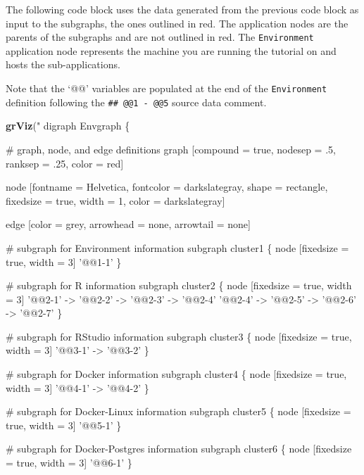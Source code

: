 \documentclass[]{book}
\newenvironment{Shaded}{\begin{snugshade}}{\end{snugshade}}
\newcommand{\KeywordTok}[1]{\textcolor[rgb]{0.13,0.29,0.53}{\textbf{#1}}}
\newcommand{\NormalTok}[1]{#1}
\newcommand{\StringTok}[1]{\textcolor[rgb]{0.31,0.60,0.02}{#1}}
\theoremstyle{definition}
\theoremstyle{definition}
\theoremstyle{definition}
\theoremstyle{remark}
\begin{document}
The following code block uses the data generated from the previous code
block as input to the subgraphs, the ones outlined in red. The
application nodes are the parents of the subgraphs and are not outlined
in red. The \texttt{Environment} application node represents the machine
you are running the tutorial on and hosts the sub-applications.

Note that the `@@' variables are populated at the end of the
\texttt{Environment} definition following the \texttt{\#\#\ @@1\ -\ @@5}
source data comment.

\begin{Shaded}
\begin{Highlighting}[]
\KeywordTok{grViz}\NormalTok{(}\StringTok{"}
\StringTok{digraph Envgraph \{}

\StringTok{  # graph, node, and edge definitions}
\StringTok{  graph [compound = true, nodesep = .5, ranksep = .25,}
\StringTok{         color = red]}

\StringTok{  node [fontname = Helvetica, fontcolor = darkslategray,}
\StringTok{        shape = rectangle, fixedsize = true, width = 1,}
\StringTok{        color = darkslategray]}

\StringTok{  edge [color = grey, arrowhead = none, arrowtail = none]}

\StringTok{  # subgraph for Environment information}
\StringTok{  subgraph cluster1 \{}
\StringTok{    node [fixedsize = true, width = 3]}
\StringTok{    '@@1-1' }
\StringTok{  \}}

\StringTok{  # subgraph for R information}
\StringTok{  subgraph cluster2 \{}
\StringTok{    node [fixedsize = true, width = 3]}
\StringTok{    '@@2-1' -> '@@2-2' -> '@@2-3' -> '@@2-4'}
\StringTok{    '@@2-4' -> '@@2-5' -> '@@2-6' -> '@@2-7'}
\StringTok{  \}}

\StringTok{  # subgraph for RStudio information}
\StringTok{  subgraph cluster3 \{}
\StringTok{    node [fixedsize = true, width = 3]}
\StringTok{    '@@3-1' -> '@@3-2'}
\StringTok{  \}}

\StringTok{  # subgraph for Docker information}
\StringTok{  subgraph cluster4 \{}
\StringTok{    node [fixedsize = true, width = 3]}
\StringTok{    '@@4-1' -> '@@4-2'}
\StringTok{  \}}

\StringTok{  # subgraph for Docker-Linux information}
\StringTok{  subgraph cluster5 \{}
\StringTok{    node [fixedsize = true, width = 3]}
\StringTok{    '@@5-1' }
\StringTok{  \}}

\StringTok{  # subgraph for Docker-Postgres information}
\StringTok{  subgraph cluster6 \{}
\StringTok{    node [fixedsize = true, width = 3]}
\StringTok{    '@@6-1' }
\StringTok{  \}}


\end{Highlighting}
\end{Shaded}
\end{document}
